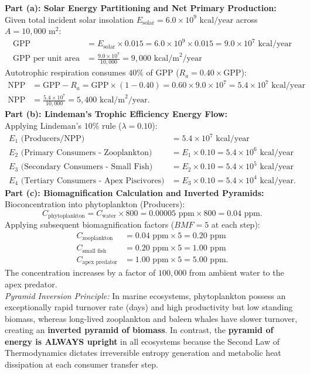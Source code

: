 \begin{solbox}
\textbf{Part (a): Solar Energy Partitioning and Net Primary Production:}\\Given total incident solar insolation $E_{\text{solar}} = 6.0 \times 10^9\text{ kcal/year}$ across $A = 10{,}000\text{ m}^2$:\begin{align*}\text{GPP} &= E_{\text{solar}} \times 0.015 = 6.0 \times 10^9 \times 0.015 = 9.0 \times 10^7\text{ kcal/year} \\\text{GPP per unit area} &= \frac{9.0 \times 10^7}{10{,}000} = 9{,}000\text{ kcal/m}^2/\text{year}\end{align*}Autotrophic respiration consumes $40\%$ of GPP ($R_a = 0.40 \times \text{GPP}$):\begin{align*}\text{NPP} &= \text{GPP} - R_a = \text{GPP} \times (1 - 0.40) = 0.60 \times 9.0 \times 10^7 = 5.4 \times 10^7\text{ kcal/year} \\\text{NPP per unit area} &= \frac{5.4 \times 10^7}{10{,}000} = 5{,}400\text{ kcal/m}^2/\text{year}.\end{align*}\textbf{Part (b): Lindeman's Trophic Efficiency Energy Flow:}\\Applying Lindeman's $10\%$ rule ($\lambda = 0.10$):\begin{align*}E_1\text{ (Producers/NPP)} &= 5.4 \times 10^7\text{ kcal/year} \\E_2\text{ (Primary Consumers - Zooplankton)} &= E_1 \times 0.10 = 5.4 \times 10^6\text{ kcal/year} \\E_3\text{ (Secondary Consumers - Small Fish)} &= E_2 \times 0.10 = 5.4 \times 10^5\text{ kcal/year} \\E_4\text{ (Tertiary Consumers - Apex Piscivores)} &= E_3 \times 0.10 = 5.4 \times 10^4\text{ kcal/year}.\end{align*}\textbf{Part (c): Biomagnification Calculation and Inverted Pyramids:}\\Bioconcentration into phytoplankton (Producers):\begin{equation*}C_{\text{phytoplankton}} = C_{\text{water}} \times 800 = 0.00005\text{ ppm} \times 800 = 0.04\text{ ppm}.\end{equation*}Applying subsequent biomagnification factors ($BMF = 5$ at each step):\begin{align*}C_{\text{zooplankton}} &= 0.04\text{ ppm} \times 5 = 0.20\text{ ppm} \\C_{\text{small fish}} &= 0.20\text{ ppm} \times 5 = 1.00\text{ ppm} \\C_{\text{apex predator}} &= 1.00\text{ ppm} \times 5 = 5.00\text{ ppm}.\end{align*}The concentration increases by a factor of $100{,}000$ from ambient water to the apex predator.\\\textit{Pyramid Inversion Principle:} In marine ecosystems, phytoplankton possess an exceptionally rapid turnover rate (days) and high productivity but low standing biomass, whereas long-lived zooplankton and baleen whales have slower turnover, creating an \textbf{inverted pyramid of biomass}. In contrast, the \textbf{pyramid of energy is ALWAYS upright} in all ecosystems because the Second Law of Thermodynamics dictates irreversible entropy generation and metabolic heat dissipation at each consumer transfer step.

\end{solbox}
